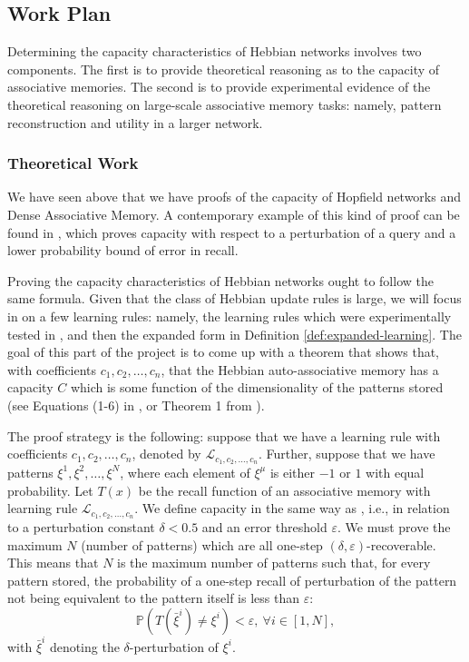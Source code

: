 \documentclass{article}
\theoremstyle{definition}
\begin{document}
\subsection{Work Plan}\label{sec:work-plan}

Determining the capacity characteristics of Hebbian networks
involves two components. The first is to provide theoretical reasoning
as to the capacity of associative memories. The second is to
provide experimental evidence of the theoretical reasoning on
large-scale associative memory tasks: namely, pattern reconstruction
and utility in a larger network.

\subsubsection{Theoretical Work}

We have seen above that we have proofs of the capacity of
Hopfield networks and Dense Associative Memory. A contemporary
example of this kind of proof can be found in \parencite{bao_capacity_2022},
which proves capacity with respect to a perturbation of a query
and a lower probability bound of error in recall.

Proving the capacity characteristics of Hebbian networks ought to
follow the same formula. Given that the class of Hebbian update rules
is large, we will focus in on a few learning rules: namely,
the learning rules which were experimentally tested in
\textcite{lansner_benchmarking_2025}, and then the expanded
form in Definition \ref{def:expanded-learning}. The goal of this
part of the project is to come up with a theorem that shows that,
with coefficients $c_1, c_2, \dots, c_n$, that the Hebbian
auto-associative memory has a capacity $C$ which is some
function of the dimensionality of the patterns stored
(see Equations (1-6) in \textcite{lansner_benchmarking_2025}, or
Theorem 1 from \textcite{bao_capacity_2022}).

The proof strategy is the following: suppose
that we have a learning rule with coefficients $c_1, c_2, \dots, c_n$,
denoted by $\mathcal{L}_{c_1, c_2, \dots, c_n}$. Further, suppose
that we have patterns $\xi^1, \xi^2, \dots, \xi^N$, where
each element of $\xi^\mu$ is either $-1$ or $1$ with equal probability.
Let $T(x)$ be the recall function of an associative memory with learning
rule $\mathcal{L}_{c_1, c_2, \dots, c_n}$. We define capacity in
the same way as \textcite{bao_capacity_2022}, i.e., in relation
to a perturbation constant $\delta < 0.5$ and an error threshold $\varepsilon$.
We must prove the maximum $N$ (number of patterns) which are
all one-step $(\delta, \varepsilon)$-recoverable. This means that
$N$ is the maximum number of patterns such that, for every pattern stored,
the probability of a one-step recall of perturbation of the pattern
not being equivalent to the pattern itself is less than $\varepsilon$:
\begin{equation}
  \mathbb{P}(T(\bar \xi^i) \neq \xi^i) < \varepsilon, ~\forall i \in [1, N],
\end{equation}
with $\bar \xi^i$ denoting the $\delta$-perturbation of $\xi^i$.
\end{document}
